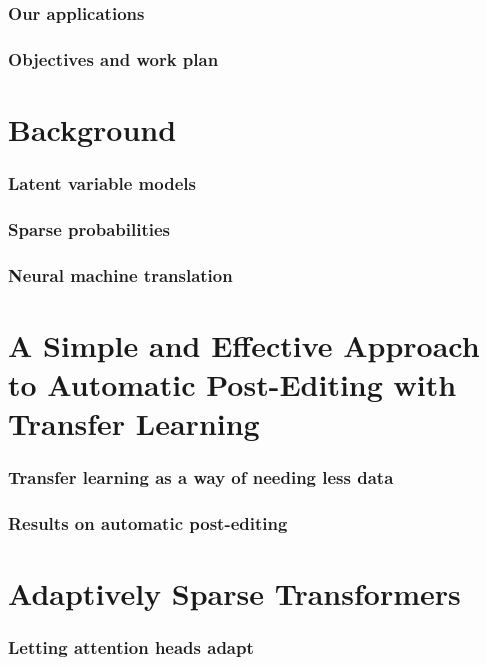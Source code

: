 \documentclass[xetex,aspectratio=169,xcolor,professionalfonts,hyperref]{beamer}
\begin{document}
\begin{frame}
    \frametitle{Our applications}
\end{frame}

\begin{frame}
    \frametitle{Objectives and work plan}
\end{frame}

\section{Background}

\begin{frame}
    \frametitle{Latent variable models}
\end{frame}

\begin{frame}
    \frametitle{Sparse probabilities}
\end{frame}

\begin{frame}
    \frametitle{Neural machine translation}
\end{frame}

\section{A Simple and Effective Approach to Automatic Post-Editing with Transfer Learning}

\begin{frame}
    \frametitle{Transfer learning as a way of needing less data}
\end{frame}

\begin{frame}
    \frametitle{Results on automatic post-editing}
\end{frame}

\section{Adaptively Sparse Transformers}

\begin{frame}
    \frametitle{Letting attention heads adapt}
\end{frame}
\end{document}
